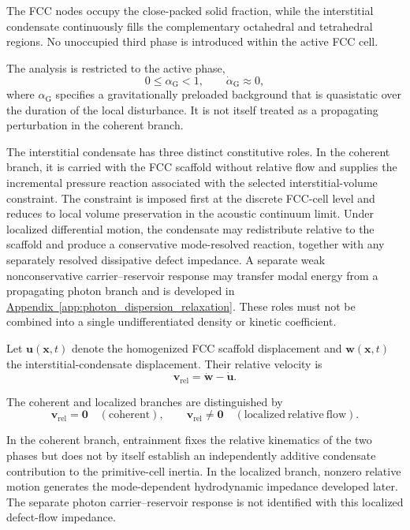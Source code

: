 The FCC nodes occupy the close-packed solid fraction, while the interstitial condensate continuously fills the complementary octahedral and tetrahedral regions. No unoccupied third phase is introduced within the active FCC cell.

The analysis is restricted to the active phase,
\begin{equation}
    0 \leq \alpha_{\mathrm{G}} < 1, \qquad
    \dot{\alpha}_{\mathrm{G}} \approx 0,
\end{equation}
where $\alpha_{\mathrm{G}}$ specifies a gravitationally preloaded background that is quasistatic over the duration of the local disturbance. It is not itself treated as a propagating perturbation in the coherent branch.

The interstitial condensate has three distinct constitutive roles. In the coherent branch, it is carried with the FCC scaffold without relative flow and supplies the incremental pressure reaction associated with the selected interstitial-volume constraint. The constraint is imposed first at the discrete FCC-cell level and reduces to local volume preservation in the acoustic continuum limit. Under localized differential motion, the condensate may redistribute relative to the scaffold and produce a conservative mode-resolved reaction, together with any separately resolved dissipative defect impedance. A separate weak nonconservative carrier--reservoir response may transfer modal energy from a propagating photon branch and is developed in \hyperref[app:photon_dispersion_relaxation]{Appendix~\ref*{app:photon_dispersion_relaxation}}. These roles must not be combined into a single undifferentiated density or kinetic coefficient.

Let $\mathbf{u}(\mathbf{x},t)$ denote the homogenized FCC scaffold displacement and $\mathbf{w}(\mathbf{x},t)$ the interstitial-condensate displacement. Their relative velocity is
\begin{equation}
    \mathbf{v}_{\mathrm{rel}} = \dot{\mathbf{w}} - \dot{\mathbf{u}}.
\end{equation}

The coherent and localized branches are distinguished by
\begin{equation}
    \mathbf{v}_{\mathrm{rel}} = \mathbf{0}
    \quad \mathrm{(coherent)}, \qquad
    \mathbf{v}_{\mathrm{rel}} \neq \mathbf{0}
    \quad \mathrm{(localized\ relative\ flow)}.
\end{equation}

In the coherent branch, entrainment fixes the relative kinematics of the two phases but does not by itself establish an independently additive condensate contribution to the primitive-cell inertia. In the localized branch, nonzero relative motion generates the mode-dependent hydrodynamic impedance developed later. The separate photon carrier--reservoir response is not identified with this localized defect-flow impedance.

